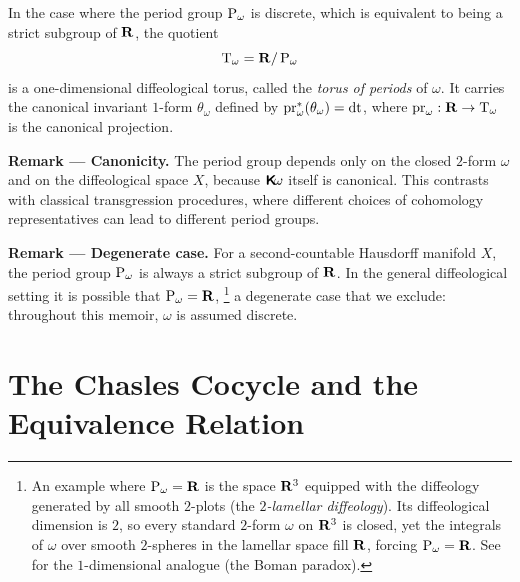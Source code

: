 \documentclass[10pt,reqno,letterpaper,twoside]{amsbook}
\begin{document}
\begin{article}
    \begin{definition}
      In the case where the period group $\operatorname{P}_\omega$ is discrete,
      which is equivalent to being a strict subgroup of ${\mathbf{R}}$,
      the quotient
      \[
        \mathrm{T}_\omega = {\mathbf{R}}/\operatorname{P}_\omega
        \]%
      is a one-dimensional diffeological torus,
      called the \emph{torus of periods} of $\omega$.
      It carries the canonical invariant $1$-form $\theta_\omega$
      defined by $\Proj_\omega^*(\theta_\omega) = \dt$,
      where $\Proj_\omega: \fieldR \to \Tomega$ is the canonical projection.
    \end{definition}
    
    \textbf{Remark --- Canonicity.}
    The period group depends only on the closed $2$-form $\omega$ and on the diffeological space $X$,
    because $\boldsymbol{\mathsf{K}}\!\omega$ itself is canonical.
    This contrasts with classical transgression procedures,
    where different choices of cohomology representatives can lead to different period groups.
    
    \textbf{Remark --- Degenerate case.}
    For a second-countable Hausdorff manifold $X$,
    the period group $\operatorname{P}_\omega$ is always a strict subgroup of ${\mathbf{R}}$.
    In the general diffeological setting it is possible that
    $\operatorname{P}_\omega = {\mathbf{R}}$,%
    \footnote{An example where $\operatorname{P}_\omega = {\mathbf{R}}$ is the space ${\mathbf{R}}^3$
    equipped with the diffeology generated by all smooth $2$-plots
    (the \emph{$2$-lamellar diffeology}).
    Its diffeological dimension is $2$,
    so every standard $2$-form $\omega$ on ${\mathbf{R}}^3$ is closed,
    yet the integrals of $\omega$ over smooth $2$-spheres in the
    lamellar space fill ${\mathbf{R}}$,
    forcing $\operatorname{P}_\omega = {\mathbf{R}}$.
    See \cite{PIZ25c} for the $1$-dimensional analogue
    (the Boman paradox).}
    a degenerate case that we exclude:
    throughout this memoir,
    $\omega$ is assumed discrete.
  \end{article}
  
  \section{The Chasles Cocycle and the Equivalence Relation}
  \label{sec:The Chasles Cocycle and the Equivalence Relation}
  
\end{document}
